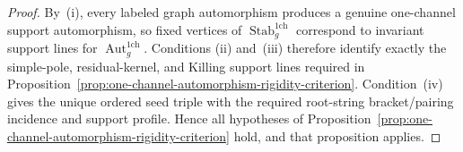 \begin{proof}
By~\textup{(i)}, every labeled graph automorphism produces a genuine
one-channel support automorphism, so fixed vertices of
$\operatorname{Stab}_g^{\mathrm{1ch}}$ correspond to invariant support
lines for $\operatorname{Aut}_g^{\mathrm{1ch}}$.  Conditions
\textup{(ii)} and~\textup{(iii)} therefore identify exactly the
simple-pole, residual-kernel, and Killing support lines required in
Proposition~\ref{prop:one-channel-automorphism-rigidity-criterion}.
Condition~\textup{(iv)} gives the unique ordered seed triple with the
required root-string bracket/pairing incidence and support profile.
Hence all hypotheses of
Proposition~\ref{prop:one-channel-automorphism-rigidity-criterion}
hold, and that proposition applies.
\end{proof}

